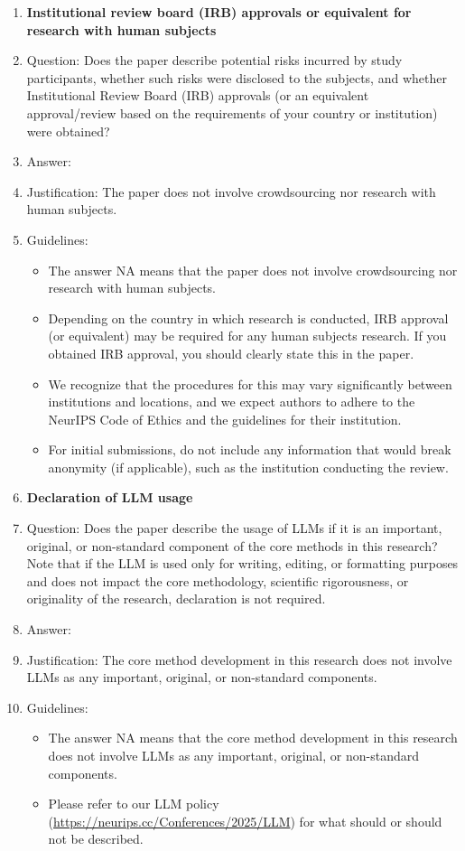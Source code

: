 \documentclass{article}
\theoremstyle{plain}
\theoremstyle{definition}
\theoremstyle{remark}
\begin{document}
\begin{enumerate}
\item {\bf Institutional review board (IRB) approvals or equivalent for research with human subjects}
    \item[] Question: Does the paper describe potential risks incurred by study participants, whether such risks were disclosed to the subjects, and whether Institutional Review Board (IRB) approvals (or an equivalent approval/review based on the requirements of your country or institution) were obtained?
    \item[] Answer: \answerNA{} %
    \item[] Justification: The paper does not involve crowdsourcing nor research with human subjects.
    \item[] Guidelines:
    \begin{itemize}
        \item The answer NA means that the paper does not involve crowdsourcing nor research with human subjects.
        \item Depending on the country in which research is conducted, IRB approval (or equivalent) may be required for any human subjects research. If you obtained IRB approval, you should clearly state this in the paper. 
        \item We recognize that the procedures for this may vary significantly between institutions and locations, and we expect authors to adhere to the NeurIPS Code of Ethics and the guidelines for their institution. 
        \item For initial submissions, do not include any information that would break anonymity (if applicable), such as the institution conducting the review.
    \end{itemize}

\item {\bf Declaration of LLM usage}
    \item[] Question: Does the paper describe the usage of LLMs if it is an important, original, or non-standard component of the core methods in this research? Note that if the LLM is used only for writing, editing, or formatting purposes and does not impact the core methodology, scientific rigorousness, or originality of the research, declaration is not required.
    \item[] Answer: \answerNA{} %
    \item[] Justification: The core method development in this research does not involve LLMs as any important, original, or non-standard components.
    \item[] Guidelines:
    \begin{itemize}
        \item The answer NA means that the core method development in this research does not involve LLMs as any important, original, or non-standard components.
        \item Please refer to our LLM policy (\url{https://neurips.cc/Conferences/2025/LLM}) for what should or should not be described.
    \end{itemize}

\end{enumerate}
\fi
\end{document}
